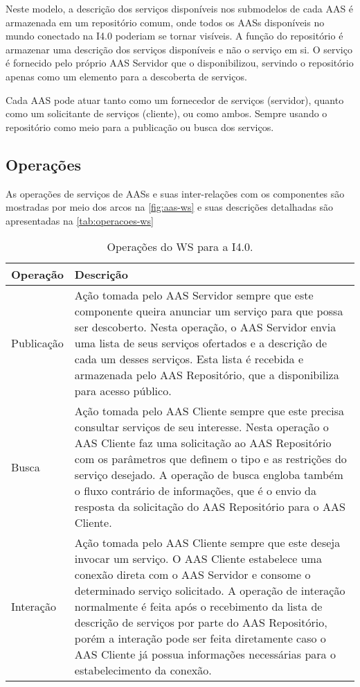 	Neste modelo, a descrição dos serviços disponíveis nos submodelos de cada AAS é armazenada em um repositório comum, onde todos os AASs disponíveis no mundo conectado na I4.0 poderiam se tornar visíveis. A função do repositório é armazenar uma descrição dos serviços disponíveis e não o serviço em si. O serviço é fornecido pelo próprio AAS Servidor que o disponibilizou, servindo o repositório apenas como um elemento para a descoberta de serviços.

	Cada AAS pode atuar tanto como um fornecedor de serviços (servidor), quanto como um solicitante de serviços (cliente), ou como ambos. Sempre usando o repositório como meio para a publicação ou busca dos serviços.

\subsection{Operações}

	As operações de serviços de AASs e suas inter-relações com os componentes são mostradas por meio dos arcos na \autoref{fig:aas-ws} e suas descrições detalhadas são apresentadas na \autoref{tab:operacoes-ws}
	
	\begin{table}[htb]
		\centering
		\caption{Operações do WS para a I4.0.}
		\label{tab:operacoes-ws}
		\begin{tabular}{p{3cm}p{12cm}}
			\hline
			\textbf{Operação}
			& \textbf{Descrição} \\ 
			
			\hline
			Publicação
			& Ação tomada pelo AAS Servidor sempre que este componente queira anunciar um serviço para que possa ser descoberto. Nesta operação, o AAS Servidor envia uma lista de seus serviços ofertados e a descrição de cada um desses serviços. Esta lista é recebida e armazenada pelo AAS Repositório, que a disponibiliza para acesso público. \\
			
			\hline
			Busca
			& Ação tomada pelo AAS Cliente sempre que este precisa consultar serviços de seu interesse. Nesta operação o AAS Cliente faz uma solicitação ao AAS Repositório com os parâmetros que definem o tipo e as restrições do serviço desejado. A operação de busca engloba também o fluxo contrário de informações, que é o envio da resposta da solicitação do AAS Repositório para o AAS Cliente. \\
			
			\hline
			Interação
			& Ação tomada pelo AAS Cliente sempre que este deseja invocar um serviço. O AAS Cliente estabelece uma conexão direta com o AAS Servidor e consome o determinado serviço solicitado. A operação de interação normalmente é feita após o recebimento da lista de descrição de serviços por parte do AAS Repositório, porém a interação pode ser feita diretamente caso o AAS Cliente já possua informações necessárias para o estabelecimento da conexão.  \\
			
			\hline
		\end{tabular}
	\end{table}

